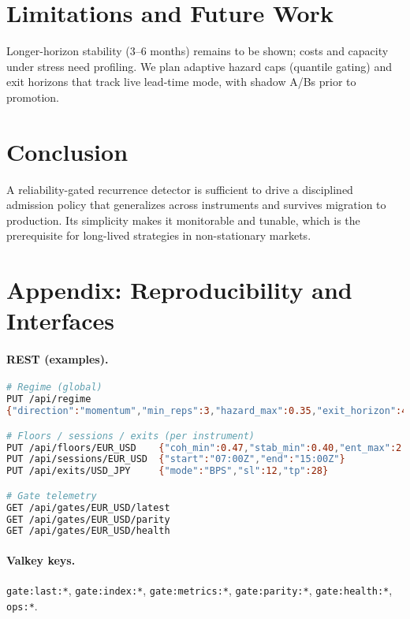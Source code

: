 \documentclass[11pt]{article}
\begin{document}
\section{Limitations and Future Work}
Longer-horizon stability (3--6 months) remains to be shown; costs and capacity under stress need profiling.
We plan adaptive hazard caps (quantile gating) and exit horizons that track live lead-time mode, with shadow
A/Bs prior to promotion.

\section{Conclusion}
A reliability-gated recurrence detector is sufficient to drive a disciplined admission policy that generalizes
across instruments and survives migration to production. Its simplicity makes it monitorable and tunable, which
is the prerequisite for long-lived strategies in non-stationary markets.

\appendix
\section*{Appendix: Reproducibility and Interfaces}
\paragraph{REST (examples).}
\begin{lstlisting}[language=bash,basicstyle=\ttfamily\small]
# Regime (global)
PUT /api/regime
{"direction":"momentum","min_reps":3,"hazard_max":0.35,"exit_horizon":40}

# Floors / sessions / exits (per instrument)
PUT /api/floors/EUR_USD    {"coh_min":0.47,"stab_min":0.40,"ent_max":2.10}
PUT /api/sessions/EUR_USD  {"start":"07:00Z","end":"15:00Z"}
PUT /api/exits/USD_JPY     {"mode":"BPS","sl":12,"tp":28}

# Gate telemetry
GET /api/gates/EUR_USD/latest
GET /api/gates/EUR_USD/parity
GET /api/gates/EUR_USD/health
\end{lstlisting}

\paragraph{Valkey keys.} \texttt{gate:last:*}, \texttt{gate:index:*}, \texttt{gate:metrics:*},
\texttt{gate:parity:*}, \texttt{gate:health:*}, \texttt{ops:*}.
\end{document}
